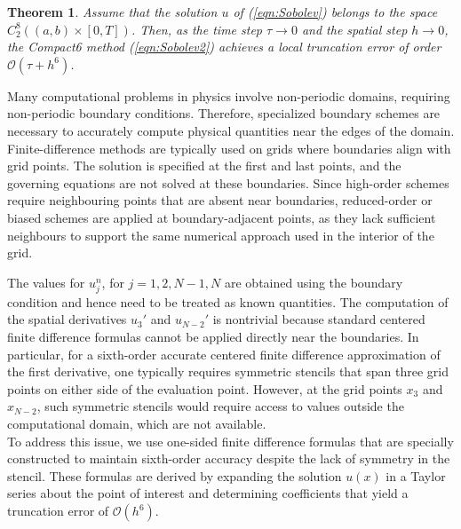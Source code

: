 \documentclass[11pt,a4paper]{amsart}
\theoremstyle{plain}
\newtheorem{theorem}{Theorem}[section]
\theoremstyle{definition}
\theoremstyle{remark}
\numberwithin{equation}{section}
\begin{document}
\begin{theorem}\label{eqn:Trun_Err}
Assume that the solution $ u $ of (\ref{eqn:Sobolev}) belongs to the space $ C^8_2((a, b) \times [0, T]) $. Then, as the time step $ \tau \to 0 $ and the spatial step $ h \to 0 $, the Compact6 method (\ref{eqn:Sobolev2})  achieves a local truncation error of order $ \mathcal{O}(\tau + h^6) $.
\end{theorem}
\label{sub_sec:BC}
Many computational problems in physics involve non-periodic domains, requiring non-periodic boundary conditions. Therefore, specialized boundary schemes are necessary to accurately compute physical quantities near the edges of the domain. Finite-difference methods are typically used on grids where boundaries align with grid points. The solution is specified at the first and last points, and the governing equations are not solved at these boundaries. Since high-order schemes require neighbouring points that are absent near boundaries, reduced-order or biased schemes are applied at boundary-adjacent points, as they lack sufficient neighbours to support the same numerical approach used in the interior of the grid.
\par
The values for $u_j^{n}$, for $j=1, 2, N-1, N$ are obtained using the boundary condition and hence need to be treated as known quantities. The computation of the spatial derivatives \( u_3' \) and \( u_{N-2}' \) is nontrivial because standard centered finite difference formulas cannot be applied directly near the boundaries. In particular, for a sixth-order accurate centered finite difference approximation of the first derivative, one typically requires symmetric stencils that span three grid points on either side of the evaluation point. However, at the grid points \( x_3 \) and \( x_{N-2} \), such symmetric stencils would require access to values outside the computational domain, which are not available.\\
To address this issue, we use one-sided finite difference formulas that are specially constructed to maintain sixth-order accuracy despite the lack of symmetry in the stencil. These formulas are derived by expanding the solution \( u(x) \) in a Taylor series about the point of interest and determining coefficients that yield a truncation error of \( \mathcal{O}(h^6) \).\\
\end{document}
